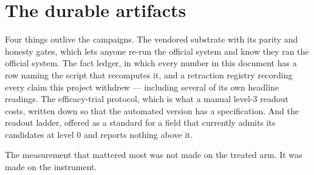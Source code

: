 \section*{The durable artifacts}

Four things outlive the campaigns. The vendored substrate with its parity
and honesty gates, which lets anyone re-run the official system and know
they ran the official system. The fact ledger, in which every number in
this document has a row naming the script that recomputes it, and a
retraction registry recording every claim this project withdrew ---
including several of its own headline readings. The efficacy-trial
protocol, which is what a manual level-3 readout costs, written down so
that the automated version has a specification. And the readout ladder,
offered as a standard for a field that currently admits its candidates at
level 0 and reports nothing above it.

The measurement that mattered most was not made on the treated arm. It was
made on the instrument.
